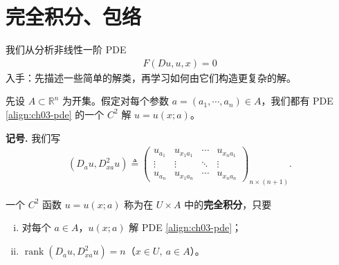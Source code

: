 \documentclass[../../main.tex]{subfiles}
\begin{document}
\section{完全积分、包络}\label{section:ch03-complete}

我们从分析非线性一阶 PDE
\begin{align}\label{align:ch03-pde}
F(Du,u,x)=0
\end{align}
入手：先描述一些简单的解类，再学习如何由它们构造更复杂的解。

先设 $A\subset\mathbb{R}^n$ 为开集。假定对每个参数 $a=(a_1,\cdots,a_n)\in A$，我们都有 PDE \eqref{align:ch03-pde} 的一个 $C^2$ 解 $u=u(x;a)$。

\textbf{记号.} 我们写
\begin{align}\label{align:ch03-dau}
(D_a u,D_{xa}^2 u)\triangleq
\begin{pmatrix}
u_{a_1} & u_{x_1 a_1} & \cdots & u_{x_n a_1}\\
\vdots & \vdots & \ddots & \vdots\\
u_{a_n} & u_{x_1 a_n} & \cdots & u_{x_n a_n}
\end{pmatrix}_{n\times(n+1)}.
\end{align}

\begin{definition}\label{definition:ch03-complete}
一个 $C^2$ 函数 $u=u(x;a)$ 称为在 $U\times A$ 中的\textbf{完全积分}，只要
\begin{enumerate}[(i)]
\item 对每个 $a\in A$，$u(x;a)$ 解 PDE \eqref{align:ch03-pde}；
\item $\operatorname{rank}(D_a u,D_{xa}^2 u)=n$（$x\in U,\ a\in A$）。
\end{enumerate}
\end{definition}
\end{document}
